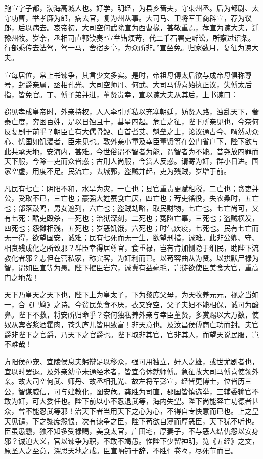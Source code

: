 \documentclass[]{article}
\begin{document}
鲍宣字子都，渤海高城人也。好学，明经，为县乡啬夫，守束州丞。后为都尉、太守功曹，举孝廉为郎，病去官，复为州从事。大司马、卫将军王商辟宣，荐为议郎，后以病去。哀帝初，大司空何武除宣为西曹掾，甚敬重焉，荐宣为谏大夫，迁豫州牧。岁余，丞相司直郭钦奏``宣举错烦苛，代二千石署吏听讼，所察过诏条。行部乘传去法驾，驾一马，舍宿乡亭，为众所非。''宣坐免。归家数月，复征为谏大夫。

宣每居位，常上书谏争，其言少文多实。是时，帝祖母傅太后欲与成帝母俱称尊号，封爵亲属，丞相孔光、大司空师丹、何武、大司马傅喜始执正议，失傅太后指，皆免官。丁、傅子弟并进，董贤贵幸，宣以谏大夫从其后，上书谏曰：

窃见孝成皇帝时，外亲持权，人人牵引所私以充塞朝廷，妨贤人路，浊乱天下，奢泰亡度，穷困百姓，是以日蚀且十，彗星四起。危亡之征，陛下所亲见也，今奈何反复剧于前乎？朝臣亡有大儒骨鲠、白首耆艾、魁垒之士，论议通古今、喟然动众心、忧国如饥渴者，臣未见也。敦外亲小童及幸臣董贤等在公门省户下，陛下欲与此共承天地，安海内，甚难。今世俗谓不智者为能，谓智者为不能。昔尧放四罪而天下服，今除一吏而众皆惑；古刑人尚服，今赏人反惑。请寄为奸，群小日进。国家空虚，用度不足。民流亡，去城郭，盗贼并起，吏为残贼，岁增于前。

凡民有七亡：阴阳不和，水旱为灾，一亡也；县官重责更赋租税，二亡也；贪吏并公，受取不已，三亡也；豪强大姓蚕食亡厌，四亡也；苛吏徭役，失农桑时，五亡也；部落鼓鸣，男女遮列，六亡也；盗贼劫略，取民财物，七亡也。七亡尚可，又有七死：酷吏殴杀，一死也；治狱深刻，二死也；冤陷亡辜，三死也；盗贼横发，四死也；怨雠相残，五死也；岁恶饥饿，六死也；时气疾疫，七死也。民有七亡而无一得，欲望国安，诚难；民有七死而无一生，欲望刑措，诚难。此非公卿、守、相贪残成化之所致邪？群臣幸得居尊官，食重禄，岂有肯加恻隐于细民，助陛下流教化者邪？志但在营私家，称宾客，为奸利而已。以苟容曲从为贤。以拱默尸禄为智，谓如臣宣等为愚。陛下擢臣岩穴，诚冀有益毫毛，岂徒欲使臣美食大官，重高门之地哉！

天下乃皇天之天下也，陛下上为皇太子，下为黎庶父母，为天牧养元元，视之当如一，合《尸鸠》之诗。今贫民菜食不厌，衣又穿空，父子夫妇不能相保，诚可为酸鼻。陛下不救，将安所归命乎？奈何独私养外亲与幸臣董贤，多赏赐以大万数，使奴从宾客浆酒霍肉，苍头庐儿皆用致富！非天意也。及汝昌侯傅商亡功而封。夫官爵非陛下之官爵，乃天下之官爵也。陛下取非其官，官非其人，而望天说民服，岂不难哉！

方阳侯孙宠、宜陵侯息夫躬辩足以移众，强可用独立，奸人之雄，或世尤剧者也，宜以时罢退。及外亲幼童未通经术者，皆宜令休就师傅。急征故大司马傅喜使领外亲。故大司空何武、师丹、故丞相孔光、故左将军彭宣，经皆更博士，位皆历三公，智谋威信，可与建教化，图安危。龚胜为司直，郡国皆慎选举，三辅委输官不敢为奸，可大委任也。陛下前以小不忍退武等，海内失望。陛下尚能容亡功德者甚众，曾不能忍武等邪！治天下者当用天下之心为心，不得自专快意而已也。上之皇天见谴，下之黎庶怨恨，次有谏争之臣，陛下苟欲自薄而厚恶臣，天下犹不听也。臣虽愚戆，独不知多受禄赐，美食太官，广田宅，厚妻子，不与恶人结仇怨以安身邪？诚迫大义，官以谏争为职，不敢不竭愚。惟陛下少留神明，览《五经》之文，原圣人之至意，深思天地之戒。臣宣呐钝于辞，不胜忄卷々，尽死节而已。
\end{document}
